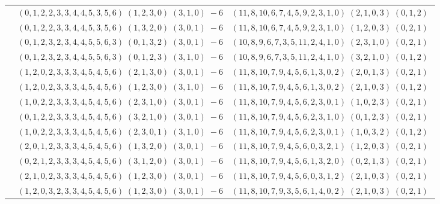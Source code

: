 \documentclass[11pt]{article}
\begin{document}
\begin{longtable}[l]{|c|c|c|}
 \cline{2-3} 
 & $(0 ,1 ,2 ,2 ,3 ,3 ,4 ,4 ,5 ,3 ,5 ,6) \;(1 ,2 ,3 ,0) \;(3 ,1 ,0) \;-6$ & $(11 ,8 ,10 ,6 ,7 ,4 ,5 ,9 ,2 ,3 ,1 ,0) \;(2 ,1 ,0 ,3) \;(0 ,1 ,2) \;$\\ 
 \cline{2-3} 
 & $(0 ,1 ,2 ,2 ,3 ,3 ,4 ,4 ,5 ,3 ,5 ,6) \;(1 ,3 ,2 ,0) \;(3 ,0 ,1) \;-6$ & $(11 ,8 ,10 ,6 ,7 ,4 ,5 ,9 ,2 ,3 ,1 ,0) \;(1 ,2 ,0 ,3) \;(0 ,2 ,1) \;$\\ 
 \cline{2-3} 
 & $(0 ,1 ,2 ,3 ,2 ,3 ,4 ,4 ,5 ,5 ,6 ,3) \;(0 ,1 ,3 ,2) \;(3 ,0 ,1) \;-6$ & $(10 ,8 ,9 ,6 ,7 ,3 ,5 ,11 ,2 ,4 ,1 ,0) \;(2 ,3 ,1 ,0) \;(0 ,2 ,1) \;$\\ 
 \cline{2-3} 
 & $(0 ,1 ,2 ,3 ,2 ,3 ,4 ,4 ,5 ,5 ,6 ,3) \;(0 ,1 ,2 ,3) \;(3 ,1 ,0) \;-6$ & $(10 ,8 ,9 ,6 ,7 ,3 ,5 ,11 ,2 ,4 ,1 ,0) \;(3 ,2 ,1 ,0) \;(0 ,1 ,2) \;$\\ 
 \cline{2-3} 
 & $(1 ,2 ,0 ,2 ,3 ,3 ,3 ,4 ,5 ,4 ,5 ,6) \;(2 ,1 ,3 ,0) \;(3 ,0 ,1) \;-6$ & $(11 ,8 ,10 ,7 ,9 ,4 ,5 ,6 ,1 ,3 ,0 ,2) \;(2 ,0 ,1 ,3) \;(0 ,2 ,1) \;$\\ 
 \cline{2-3} 
 & $(1 ,2 ,0 ,2 ,3 ,3 ,3 ,4 ,5 ,4 ,5 ,6) \;(1 ,2 ,3 ,0) \;(3 ,1 ,0) \;-6$ & $(11 ,8 ,10 ,7 ,9 ,4 ,5 ,6 ,1 ,3 ,0 ,2) \;(2 ,1 ,0 ,3) \;(0 ,1 ,2) \;$\\ 
 \cline{2-3} 
 & $(1 ,0 ,2 ,2 ,3 ,3 ,3 ,4 ,5 ,4 ,5 ,6) \;(2 ,3 ,1 ,0) \;(3 ,0 ,1) \;-6$ & $(11 ,8 ,10 ,7 ,9 ,4 ,5 ,6 ,2 ,3 ,0 ,1) \;(1 ,0 ,2 ,3) \;(0 ,2 ,1) \;$\\ 
 \cline{2-3} 
 & $(0 ,1 ,2 ,2 ,3 ,3 ,3 ,4 ,5 ,4 ,5 ,6) \;(3 ,2 ,1 ,0) \;(3 ,0 ,1) \;-6$ & $(11 ,8 ,10 ,7 ,9 ,4 ,5 ,6 ,2 ,3 ,1 ,0) \;(0 ,1 ,2 ,3) \;(0 ,2 ,1) \;$\\ 
 \cline{2-3} 
 & $(1 ,0 ,2 ,2 ,3 ,3 ,3 ,4 ,5 ,4 ,5 ,6) \;(2 ,3 ,0 ,1) \;(3 ,1 ,0) \;-6$ & $(11 ,8 ,10 ,7 ,9 ,4 ,5 ,6 ,2 ,3 ,0 ,1) \;(1 ,0 ,3 ,2) \;(0 ,1 ,2) \;$\\ 
 \cline{2-3} 
 & $(2 ,0 ,1 ,2 ,3 ,3 ,3 ,4 ,5 ,4 ,5 ,6) \;(1 ,3 ,2 ,0) \;(3 ,0 ,1) \;-6$ & $(11 ,8 ,10 ,7 ,9 ,4 ,5 ,6 ,0 ,3 ,2 ,1) \;(1 ,2 ,0 ,3) \;(0 ,2 ,1) \;$\\ 
 \cline{2-3} 
 & $(0 ,2 ,1 ,2 ,3 ,3 ,3 ,4 ,5 ,4 ,5 ,6) \;(3 ,1 ,2 ,0) \;(3 ,0 ,1) \;-6$ & $(11 ,8 ,10 ,7 ,9 ,4 ,5 ,6 ,1 ,3 ,2 ,0) \;(0 ,2 ,1 ,3) \;(0 ,2 ,1) \;$\\ 
 \cline{2-3} 
 & $(2 ,1 ,0 ,2 ,3 ,3 ,3 ,4 ,5 ,4 ,5 ,6) \;(1 ,2 ,3 ,0) \;(3 ,0 ,1) \;-6$ & $(11 ,8 ,10 ,7 ,9 ,4 ,5 ,6 ,0 ,3 ,1 ,2) \;(2 ,1 ,0 ,3) \;(0 ,2 ,1) \;$\\ 
 \cline{2-3} 
 & $(1 ,2 ,0 ,3 ,2 ,3 ,3 ,4 ,5 ,4 ,5 ,6) \;(1 ,2 ,3 ,0) \;(3 ,0 ,1) \;-6$ & $(11 ,8 ,10 ,7 ,9 ,3 ,5 ,6 ,1 ,4 ,0 ,2) \;(2 ,1 ,0 ,3) \;(0 ,2 ,1) \;$\\ 

\end{longtable}
\end{document}
